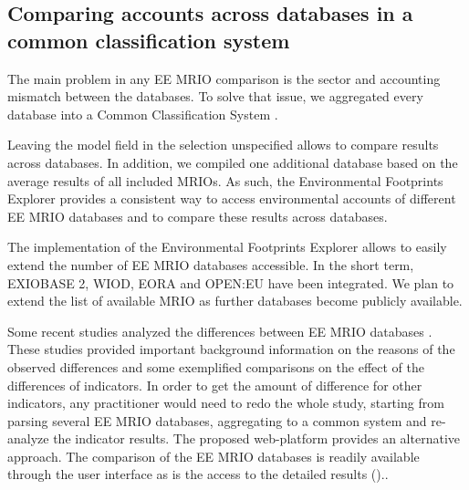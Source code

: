 \subsection{Comparing accounts across databases in a common classification system}

The main problem in any EE MRIO comparison is the sector and accounting
mismatch between the databases. To solve that issue, we aggregated every
database into a Common Classification System \cite{Steen_Olsen_2014}. 

Leaving the model field in the selection unspecified allows to compare results across databases. 
In addition, we compiled one additional database based on the average results of all included MRIOs.
As such, the Environmental Footprints Explorer provides a consistent way to access environmental accounts of different EE MRIO databases and to compare these results across databases.

The implementation of the Environmental Footprints Explorer allows to easily extend the number of EE MRIO databases accessible. In the short term, EXIOBASE 2, WIOD, EORA and OPEN:EU  have been integrated. We plan to extend the list of available MRIO as further databases become publicly available. 

Some recent studies analyzed the differences between EE MRIO databases \cite{Stadler_2014, Owen_2014, Moran_2014}. These studies provided important background information on the reasons of the observed differences and some exemplified comparisons on the effect of the differences of indicators. In order to get the amount of difference for other indicators, any practitioner would need to redo the whole study, starting from parsing several EE MRIO databases, aggregating to a common system and re-analyze the indicator results. 
The proposed web-platform provides an alternative approach. The comparison of the EE MRIO databases is readily available through the user interface as is the access to the detailed results ()..
